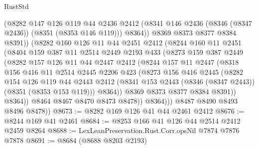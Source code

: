 \begin{lexlean}{RustStd}
\begin{coremodule}
{\begin{coremodule}
{{{{{{{{{{{{{{{{{{{{{{{{{{{{{{{{{{{{{{{{{{{{{{{{{{                  (@8282
                    @147
                    @126
                    @119
                    @44
                    @2436
                    @2412
                    (@8341 @146 @2436 (@8346 (@8347 @2436)) (@8351 (@8353 @146 @119)))
                    @8364))
                @8369
                @8373
                @8377
                @8384
                @8391))
            (@8282
              @160
              @126
              @11
              @44
              @2451
              @2412
              (@8244
                @160
                @11
                @2451
                (@8404
                  @159
                  @387
                  @11
                  @2514
                  @2449
                  @2193
                  @433
                  (@8273
                    @159
                    @387
                    @2449
                    (@8282
                      @157
                      @126
                      @11
                      @44
                      @2447
                      @2412
                      (@8244
                        @157
                        @11
                        @2447
                        (@8318
                          @156
                          @416
                          @11
                          @2514
                          @2445
                          @2206
                          @423
                          (@8273
                            @156
                            @416
                            @2445
                            (@8282
                              @154
                              @126
                              @119
                              @44
                              @2443
                              @2412
                              (@8341 @153 @2443 (@8346 (@8347 @2443)) (@8351 (@8353 @153 @119)))
                              @8364))
                          @8369
                          @8373
                          @8377
                          @8384
                          @8391))
                      @8364))
                  @8464
                  @8467
                  @8470
                  @8473
                  @8478))
              @8364)))
        @8487
        @8490
        @8493
        @8496
        @8478))
@8673 := @8282 @169 @126 @41 @44 @2461 @2412
@8676 := @8244 @169 @41 @2461
@8684 := @8253 @166 @41 @126 @44 @2514 @2412 @2459 @8264
@8688 := LexLeanPreservation.Rust.Corr.opsNil @7874 @7876 @7878
@8691 := @8684 (@8688 @8203 @2193)
}}}}}}}}}}}}}}}}}}}}}}}}}}}}}}}}}}}}}}}}}}}}}}}}}}
\end{coremodule}}
\end{coremodule}
\end{lexlean}
